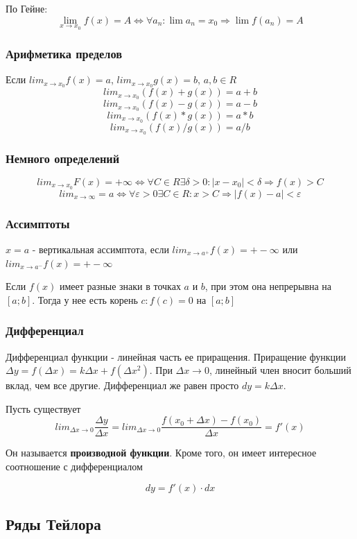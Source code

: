 \documentclass{article}
\begin{document}
По Гейне: 
$$\lim_{x\to x_0} f(x) = A \Leftrightarrow \forall {a_n}: \lim a_n=x_0 \Rightarrow \lim f(a_n) = A $$


\subsubsection{Арифметика пределов}
Если $lim_{x\to x_0} f(x) = a$, $lim_{x\to x_0} g(x) = b$, $a,b \in R$
$$lim _{x\to x_0}(f(x)+g(x)) = a+b$$
$$lim _{x\to x_0}(f(x)-g(x)) = a-b$$
$$lim _{x\to x_0}(f(x)*g(x)) = a*b$$
$$lim _{x\to x_0}(f(x)/g(x)) = a/b$$

\subsubsection{Немного определений}

$$lim _{x\to x_0} F(x) = + \infty \Leftrightarrow \forall C \in R \exists \delta>0:|x-x_0|<\delta \Rightarrow f(x)>C$$
$$lim _{x\to \infty} = a \Leftrightarrow \forall \varepsilon>0 \exists C\in R: x>C \Rightarrow |f(x)-a|<\varepsilon$$

\subsubsection{Ассимптоты}

$x=a$ - вертикальная ассимптота, если $lim_{x\to a^+} f(x)=+-\infty$ или $lim_{x\to a^-} f(x)=+-\infty$

Если $f(x)$ имеет разные знаки в точках $a$ и $b$, при этом она непрерывна на $[a;b]$. Тогда у нее есть корень $c: f(c)=0$ на $[a;b]$



\subsubsection{Дифференциал}
Дифференциал функции - линейная часть ее приращения. Приращение функции $\Delta y = f(\Delta x) = k \Delta x + f(\Delta x^2)$. При $\Delta x \to 0$, линейный член вносит больший вклад, чем все другие. Дифференциал же равен просто $dy =k\Delta x$.

Пусть существует $$lim_{\Delta x \to 0}\frac{\Delta y}{\Delta x} = lim_{\Delta x \to 0}\frac{f(x_0 + \Delta x) - f(x_0)}{\Delta x} =f'(x)$$

Он называется \textbf{производной функции}. Кроме того, он имеет интересное соотношение с дифференциалом

$$dy = f'(x)\cdot dx$$


\subsection*{Ряды Тейлора}
\end{document}
